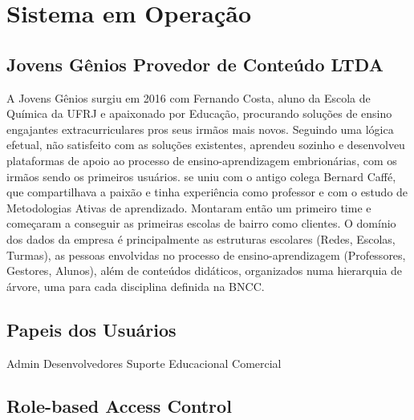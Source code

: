 \chapter{Sistema em Operação}
\label{chap5}


\section{Jovens Gênios Provedor de Conteúdo LTDA}

A Jovens Gênios surgiu em 2016 com Fernando Costa, aluno da Escola de Química da UFRJ e apaixonado por Educação, procurando soluções de ensino engajantes extracurriculares pros seus irmãos mais novos. Seguindo uma lógica efetual, não satisfeito com as soluções existentes, aprendeu sozinho e desenvolveu plataformas de apoio ao processo de ensino-aprendizagem embrionárias, com os irmãos sendo os primeiros usuários.
se uniu com o antigo colega Bernard Caffé, que compartilhava a paixão e tinha experiência como professor e com o estudo de Metodologias Ativas de aprendizado. Montaram então um primeiro time e começaram a conseguir as primeiras escolas de bairro como clientes.
O domínio dos dados da empresa é principalmente as estruturas escolares (Redes, Escolas, Turmas), as pessoas envolvidas no processo de ensino-aprendizagem (Professores, Gestores, Alunos), além de conteúdos didáticos, organizados numa hierarquia de árvore, uma para cada disciplina definida na BNCC.


\section{Papeis dos Usuários}

Admin
Desenvolvedores
Suporte
Educacional
Comercial
\section{Role-based Access Control}
